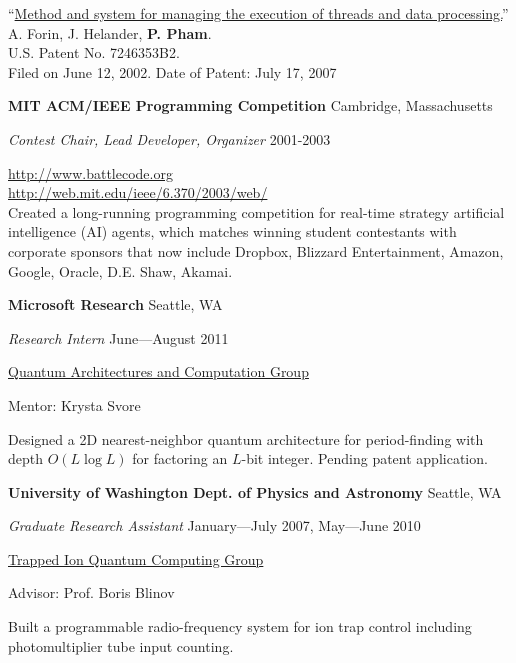 \documentclass[letter]{article}
\begin{document}
\vspace{0.5\baselineskip}

``\href{https://patents.google.com/patent/US7246353}{Method and system for managing the execution of threads and data processing.}''\\
A. Forin, J. Helander, \textbf{P. Pham}.\\
U.S. Patent No. 7246353B2.\\
Filed on June 12, 2002.
Date of Patent: July 17, 2007\\


\vspace{\baselineskip}

{\bf MIT ACM/IEEE Programming Competition} \hfill Cambridge, Massachusetts

{\em Contest Chair, Lead Developer, Organizer} \hfill 2001-2003
\vspace{0.5\baselineskip}
\par

\url{http://www.battlecode.org}\\
\url{http://web.mit.edu/ieee/6.370/2003/web/}\\
Created a long-running
programming competition for real-time strategy artificial intelligence
(AI) agents, which matches winning student contestants with corporate
sponsors that now include
Dropbox, Blizzard Entertainment, Amazon, Google, Oracle, D.E. Shaw, Akamai.

\pagebreak

\vspace{\baselineskip}
\par
{\bf {Microsoft Research}} \hfill Seattle, WA
\par
{\em Research Intern} \hfill June---August 2011
\par
\href{http://research.microsoft.com/en-us/groups/quarc/default.aspx}{Quantum Architectures and Computation Group}
\par
Mentor: Krysta Svore
\par
Designed a 2D nearest-neighbor quantum architecture for period-finding with
depth $O(L \log L)$ for factoring an $L$-bit integer. Pending patent
application.

\vspace{\baselineskip}
\par
{\bf {University of Washington Dept. of Physics and Astronomy}} \hfill Seattle, WA
\par
{\em Graduate Research Assistant} \hfill January---July 2007, May---June 2010
\par
\href{http://depts.washington.edu/qcomp/}{Trapped Ion Quantum Computing Group}
\par
Advisor: Prof. Boris Blinov
\par
Built a programmable radio-frequency system for ion trap control including
photomultiplier tube input counting.
\end{document}
